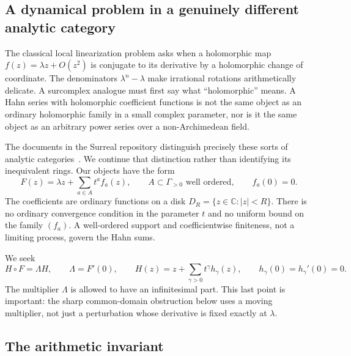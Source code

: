 \documentclass[11pt,a4paper]{article}
\numberwithin{equation}{section}
\theoremstyle{definition}
\theoremstyle{remark}
\newcommand{\C}{\mathbb C}
\begin{document}
\subsection{A dynamical problem in a genuinely different analytic category}

The classical local linearization problem asks when a holomorphic map
$f(z)=\lambda z+O(z^2)$ is conjugate to its derivative by a holomorphic change
of coordinate. The denominators $\lambda^n-\lambda$ make irrational
rotations arithmetically delicate. A surcomplex analogue must first say what
``holomorphic'' means. A Hahn series with holomorphic coefficient functions
is not the same object as an ordinary holomorphic family in a small complex
parameter, nor is it the same object as an arbitrary power series over a
non-Archimedean field.

The documents in the Surreal repository distinguish precisely these sorts
of analytic categories~\cite{Repo}. We continue that distinction rather than
identifying its inequivalent rings. Our objects have the form
\begin{equation}\label{eq:introF}
 F(z)=\lambda z+\sum_{a\in A}t^a f_a(z),\qquad
 A\subset\Gamma_{>0}\text{ well ordered},\qquad f_a(0)=0.
\end{equation}
The coefficients are ordinary functions on a disk $D_R=\{z\in\C:|z|<R\}$.
There is no ordinary convergence condition in the parameter $t$ and no
uniform bound on the family $(f_a)$. A well-ordered support and coefficientwise
finiteness, not a limiting process, govern the Hahn sums.

We seek
\begin{equation}\label{eq:schroeder}
 H\circ F=\Lambda H,\qquad
 \Lambda=F'(0),\qquad
 H(z)=z+\sum_{\gamma>0}t^\gamma h_\gamma(z),\qquad
 h_\gamma(0)=h_\gamma'(0)=0.
\end{equation}
The multiplier $\Lambda$ is allowed to have an infinitesimal part. This last
point is important: the sharp common-domain obstruction below uses a
moving multiplier, not just a perturbation whose derivative is fixed
exactly at $\lambda$.

\subsection{The arithmetic invariant}
\end{document}
